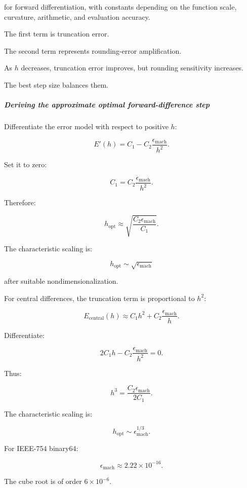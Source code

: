 for forward differentiation, with constants depending on the function scale, curvature, arithmetic, and evaluation accuracy.

The first term is truncation error.

The second term represents rounding-error amplification.

As \(h\) decreases, truncation error improves, but rounding sensitivity increases.

The best step size balances them.

\subparagraph{Deriving the approximate optimal forward-difference step}\label{02-foundations-ii-ch025-deriving-the-approximate-optimal-forward-difference-step}

\hypertarget{02-foundations-ii-ch025-deriving-the-approximate-optimal-forward-difference-step}{}

Differentiate the error model with respect to positive \(h\):

\[
E'(h)= C_1- C_2\frac{\epsilon_{\mathrm{mach}}}{h^2}.
\]

Set it to zero:

\[
C_1= C_2\frac{\epsilon_{\mathrm{mach}}}{h^2}.
\]

Therefore:

\[
\boxed{ h_{\mathrm{opt}} \approx \sqrt{\frac{C_2\epsilon_{\mathrm{mach}}}{C_1}} }.
\]

The characteristic scaling is:

\[
h_{\mathrm{opt}}\sim\sqrt{\epsilon_{\mathrm{mach}}}
\]

after suitable nondimensionalization.

For central differences, the truncation term is proportional to \(h^2\):

\[
E_{\mathrm{central}}(h) \approx C_1h^2+ C_2\frac{\epsilon_{\mathrm{mach}}}{h}.
\]

Differentiate:

\[
2C_1h- C_2\frac{\epsilon_{\mathrm{mach}}}{h^2}=0.
\]

Thus:

\[
h^3= \frac{C_2\epsilon_{\mathrm{mach}}}{2C_1}.
\]

The characteristic scaling is:

\[
\boxed{ h_{\mathrm{opt}}\sim \epsilon_{\mathrm{mach}}^{1/3} }.
\]

For IEEE-754 binary64:

\[
\epsilon_{\mathrm{mach}} \approx2.22\times10^{-16}.
\]

The cube root is of order \(6\times10^{-6}\).

